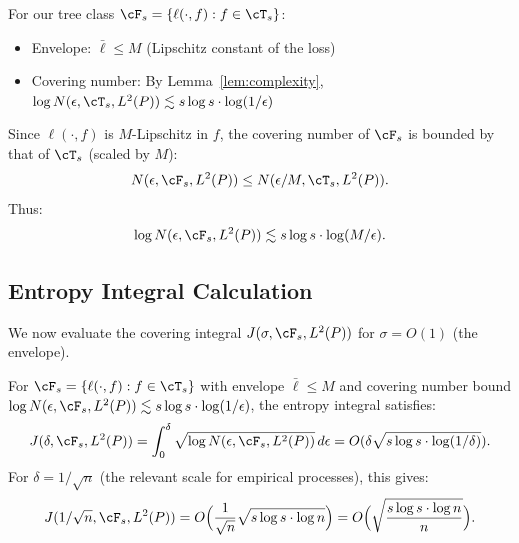 For our tree class $\cF_s = \{ \ell(\cdot, f) : f \in \cT_s \}$:
\begin{itemize}
\item Envelope: $\bar{\ell} \le M$ (Lipschitz constant of the loss)
\item Covering number: By Lemma~\ref{lem:complexity}, $\log N(\epsilon, \cT_s, L^2(P)) \lesssim s \log s \cdot \log(1/\epsilon)$
\end{itemize}

Since $\ell(\cdot, f)$ is $M$-Lipschitz in $f$, the covering number of $\cF_s$ is bounded by that of $\cT_s$ (scaled by $M$):
\[
N(\epsilon, \cF_s, L^2(P)) \le N(\epsilon / M, \cT_s, L^2(P)).
\]
Thus:
\[
\log N(\epsilon, \cF_s, L^2(P)) \lesssim s \log s \cdot \log(M/\epsilon).
\]

\subsection{Entropy Integral Calculation}

We now evaluate the covering integral $J(\sigma, \cF_s, L^2(P))$ for $\sigma = O(1)$ (the envelope).

\begin{lemma}
\label{lem:entropy-integral}
For $\cF_s = \{ \ell(\cdot, f) : f \in \cT_s \}$ with envelope $\bar{\ell} \le M$ and covering number bound $\log N(\epsilon, \cF_s, L^2(P)) \lesssim s \log s \cdot \log(1/\epsilon)$, the entropy integral satisfies:
\[
J(\delta, \cF_s, L^2(P)) = \int_0^\delta \sqrt{\log N(\epsilon, \cF_s, L^2(P))} \, d\epsilon = O(\delta \sqrt{s \log s \cdot \log(1/\delta)}).
\]
For $\delta = 1/\sqrt{n}$ (the relevant scale for empirical processes), this gives:
\[
J(1/\sqrt{n}, \cF_s, L^2(P)) = O\Bigl( \frac{1}{\sqrt{n}} \sqrt{s \log s \cdot \log n} \Bigr) = O\Bigl( \sqrt{\frac{s \log s \cdot \log n}{n}} \Bigr).
\]
\end{lemma}

